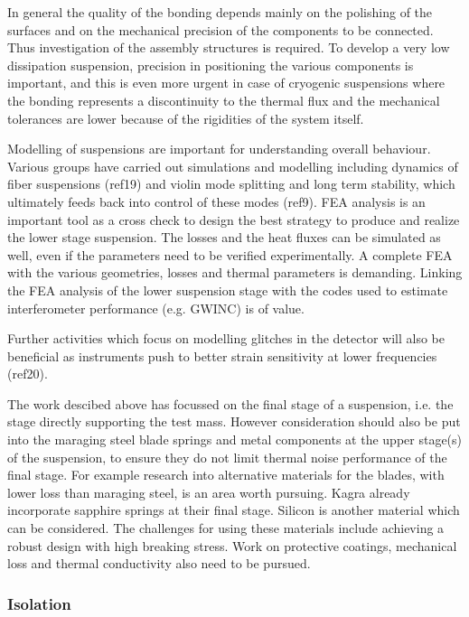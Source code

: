 In general the quality of the bonding depends mainly on the polishing of the surfaces and on the mechanical precision of the components to be connected. Thus investigation of the assembly structures is required. To develop a very low dissipation suspension, precision in positioning the various components is important, and this is even more urgent in case of cryogenic suspensions where the bonding represents a discontinuity to the thermal flux and the mechanical tolerances are lower because of the rigidities of the system itself.



Modelling of suspensions are important for understanding overall behaviour. Various groups have carried out simulations and modelling including dynamics of fiber suspensions (ref19) and violin mode splitting and long term stability, which ultimately feeds back into control of these modes (ref9). FEA analysis is an important tool as a cross check to design the best strategy to produce and realize the lower stage suspension. The losses and the heat fluxes can be simulated as well, even if the parameters need to be verified experimentally. A complete FEA with the various geometries, losses and thermal parameters is demanding. Linking the FEA analysis of the lower suspension stage with the codes used to estimate interferometer performance (e.g. GWINC) is of value.

Further activities which focus on modelling glitches in the detector will also be beneficial as instruments push to better strain sensitivity at lower frequencies (ref20).

The work descibed above has focussed on the final stage of a suspension, i.e. the stage directly supporting the test mass. However consideration should also be put into the maraging steel blade springs and metal components at the upper stage(s) of the suspension, to ensure they do not limit thermal noise performance of the final stage. For example research into alternative materials for the blades, with lower loss than maraging steel, is an area worth pursuing. Kagra already incorporate sapphire springs at their final stage. Silicon is another material which can be considered. The challenges for using these materials include achieving a robust design with high breaking stress. Work on protective coatings, mechanical loss and thermal conductivity also need to be pursued.

\subsubsection{Isolation}

